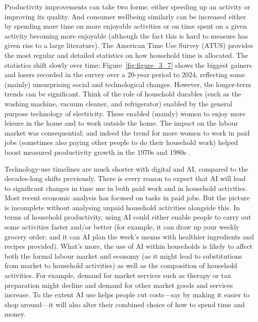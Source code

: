 \documentclass[11pt,a4paper]{article}
\begin{document}
Productivity improvements can take two forms: either speeding up an activity or improving its quality. And consumer wellbeing similarly can be increased either by spending more time on more enjoyable activities or on time spent on a given activity becoming more enjoyable (although the fact this is hard to measure has given rise to a large literature). The American Time Use Survey (ATUS) provides the most regular and detailed statistics on how household time is allocated. The statistics shift slowly over time; Figure~\ref{fig:figure_3_7} shows the biggest gainers and losers recorded in the survey over a 20-year period to 2024, reflecting some (mainly) unsurprising social and technological changes. However, the longer-term trends can be significant. Think of the role of household durables (such as the washing machine, vacuum cleaner, and refrigerator) enabled by the general purpose technology of electricity. These enabled (mainly) women to enjoy more leisure in the home and to work outside the home. The impact on the labour market was consequential; and indeed the trend for more women to work in paid jobs (sometimes also paying other people to do their household work) helped boost measured productivity growth in the 1970s and 1980s \citep[e.g.,][]{10.1257/mac.20210138, NBERc12826}.

Technology-use timelines are much shorter with digital and AI, compared to the decades-long shifts previously. There is every reason to expect that AI will lead to significant changes in time use in both paid work and in household activities. Most recent economic analysis has focused on tasks in paid jobs. But the picture is incomplete without analysing unpaid household activities alongside this. In terms of household productivity, using AI could either enable people to carry out some activities faster and/or better (for example, it can draw up your weekly grocery order; and it can AI plan the week’s menus with healthier ingredients and recipes provided). What’s more, the use of AI within households is likely to affect both the formal labour market and economy (as it might lead to substitutions from market to household activities) as well as the composition of household activities. For example, demand for market services such as therapy or tax preparation might decline and demand for other market goods and services increase. To the extent AI use helps people cut costs---say by making it easier to shop around---it will also alter their combined choice of how to spend time and money.
\end{document}
